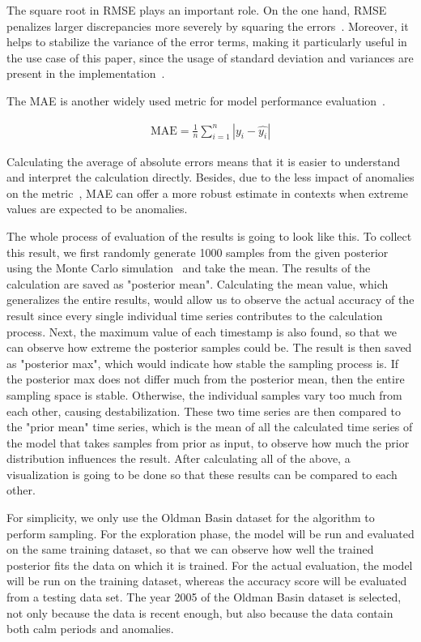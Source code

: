 The square root in RMSE plays an important role. On the one hand, RMSE penalizes larger discrepancies more severely by squaring the errors~\cite{RMSE_discrepency_penalty}. Moreover, it helps to stabilize the variance of the error terms, making it particularly useful in the use case of this paper, since the usage of standard deviation and variances are present in the implementation~\cite{RMSE_MAE}.

The MAE is another widely used metric for model performance evaluation~\cite{RMSE_MAE}.

\begin{align}
\text{MAE} = \frac 1 n \sum_{i=1}^n |y_i - \hat{y_i}|
\end{align}

Calculating the average of absolute errors means that it is easier to understand and interpret the calculation directly. Besides, due to the less impact of anomalies on the metric~\cite{RMSE_MAE}, MAE can offer a more robust estimate in contexts when extreme values are expected to be anomalies.

The whole process of evaluation of the results is going to look like this. 
To collect this result, we first randomly generate 1000 samples from the given posterior using the Monte Carlo simulation~\cite{monte_carlo_simulation} and take the mean. The results of the calculation are saved as "posterior mean". Calculating the mean value, which generalizes the entire results, would allow us to observe the actual accuracy of the result since every single individual time series contributes to the calculation process. Next, the maximum value of each timestamp is also found, so that we can observe how extreme the posterior samples could be. The result is then saved as "posterior max", which would indicate how stable the sampling process is. If the posterior max does not differ much from the posterior mean, then the entire sampling space is stable. Otherwise, the individual samples vary too much from each other, causing destabilization. These two time series are then compared to the "prior mean" time series, which is the mean of all the calculated time series of the model that takes samples from prior as input, to observe how much the prior distribution influences the result. After calculating all of the above, a visualization is going to be done so that these results can be compared to each other. 

For simplicity, we only use the Oldman Basin dataset for the algorithm to perform sampling. For the exploration phase, the model will be run and evaluated on the same training dataset, so that we can observe how well the trained posterior fits the data on which it is trained. For the actual evaluation, the model will be run on the training dataset, whereas the accuracy score will be evaluated from a testing data set. The year 2005 of the Oldman Basin dataset is selected, not only because the data is recent enough, but also because the data contain both calm periods and anomalies. 

